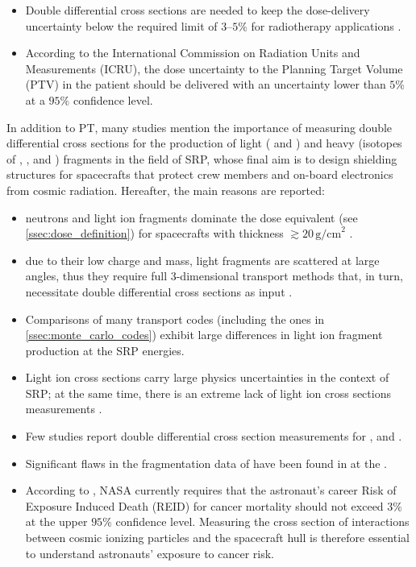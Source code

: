 \begin{itemize}
	\item Double differential cross sections are needed to keep the dose-delivery uncertainty below the required limit of $3$--$5\%$ for radiotherapy applications \cite{vanDeMerwe02012017,Thwaites_2013,PLESKAC2012130}.
	\item According to the International Commission on Radiation Units and Measurements (ICRU), the dose uncertainty to the Planning Target Volume (PTV) in the patient should be delivered with an uncertainty lower than $5\%$ at a $95\%$ confidence level.
\end{itemize}
In addition to PT, many studies mention the importance of measuring double differential cross sections for the production of light ( and ) and heavy (isotopes of , ,  and ) fragments in the field of SRP, whose final aim is to design shielding structures for spacecrafts that protect crew members and on-board electronics from cosmic radiation. Hereafter, the main reasons are reported:
\begin{itemize}
	\item neutrons and light ion fragments dominate the dose equivalent (see \autoref{ssec:dose_definition}) for spacecrafts with thickness $\gtrsim20\,\mathrm{g/cm}^2$ \cite{WALKER20131792,NORBURY201490,HUFF202390}.
	\item due to their low charge and mass, light fragments are scattered at large angles, thus they require full 3-dimensional transport methods that, in turn, necessitate double differential cross sections as input \cite{WILSON20146}.
	\item Comparisons of many transport codes (including the ones in \autoref{ssec:monte_carlo_codes}) exhibit large differences in light ion fragment production at the SRP energies.
	\item Light ion cross sections carry large physics uncertainties in the context of SRP; at the same time, there is an extreme lack of light ion cross sections measurements \cite{NORBURY2012315}.
	\item Few studies report double differential cross section measurements for ,  and  \cite{areFurtherCrossSectionMeasurementsNecessary}.
	\item Significant flaws in the fragmentation data of  have been found in \cite{areFurtherCrossSectionMeasurementsNecessary} at the .
	\item According to \cite{MedicalCountermeasureRequirementsNASA}, NASA currently requires that the astronaut's career Risk of Exposure Induced Death (REID) for cancer mortality should not exceed $3\%$ at the upper $95\%$ confidence level. Measuring the cross section of interactions between cosmic ionizing particles and the spacecraft hull is therefore essential to understand astronauts' exposure to cancer risk.
\end{itemize}